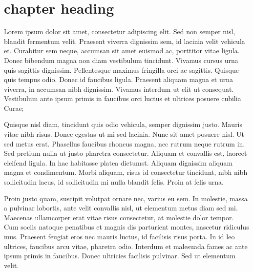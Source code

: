\documentclass[12pt, a4paper]{report}
\begin{document}
\pagestyle{plain}
\def\title{seminar tilte here}
\def\what{Annual Progress Seminar}
\def\who{Shaunak De (134316001)}
\def\guide{Prof. Avik Bhattacharya}

\coverpage
\tableofcontents
\listoffigures

\doublespacing
\newpage
{}



\chapter{chapter heading}

Lorem ipsum dolor sit amet, consectetur adipiscing elit. Sed non semper nisl, blandit fermentum velit. Praesent viverra dignissim sem, id lacinia velit vehicula et. Curabitur sem neque, accumsan sit amet euismod ac, porttitor vitae ligula. Donec bibendum magna non diam vestibulum tincidunt. Vivamus cursus urna quis sagittis dignissim. Pellentesque maximus fringilla orci ac sagittis. Quisque quis tempus odio. Donec id faucibus ligula. Praesent aliquam magna et urna viverra, in accumsan nibh dignissim. Vivamus interdum ut elit ut consequat. Vestibulum ante ipsum primis in faucibus orci luctus et ultrices posuere cubilia Curae;

Quisque nisl diam, tincidunt quis odio vehicula, semper dignissim justo. Mauris vitae nibh risus. Donec egestas ut mi sed lacinia. Nunc sit amet posuere nisl. Ut sed metus erat. Phasellus faucibus rhoncus magna, nec rutrum neque rutrum in. Sed pretium nulla ut justo pharetra consectetur. Aliquam et convallis est, laoreet eleifend ligula. In hac habitasse platea dictumst. Aliquam dignissim aliquam magna et condimentum. Morbi aliquam, risus id consectetur tincidunt, nibh nibh sollicitudin lacus, id sollicitudin mi nulla blandit felis. Proin at felis urna.

Proin justo quam, suscipit volutpat ornare nec, varius eu sem. In molestie, massa a pulvinar lobortis, ante velit convallis nisl, ut elementum metus diam sed mi. Maecenas ullamcorper erat vitae risus consectetur, at molestie dolor tempor. Cum sociis natoque penatibus et magnis dis parturient montes, nascetur ridiculus mus. Praesent feugiat eros nec mauris luctus, id facilisis risus porta. In id leo ultrices, faucibus arcu vitae, pharetra odio. Interdum et malesuada fames ac ante ipsum primis in faucibus. Donec ultricies facilisis pulvinar. Sed ut elementum velit.
\end{document}
